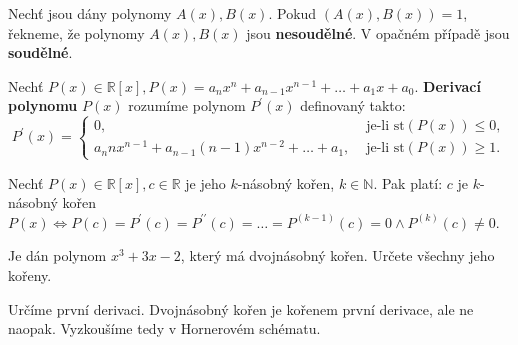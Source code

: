 \begin{definition}
  Nechť jsou dány polynomy $A(x), B(x)$. Pokud $(A(x), B(x)) = 1$, řekneme, že polynomy $A(x), B(x)$ jsou \textbf{nesoudělné}. V opačném případě jsou \textbf{soudělné}.
\end{definition}

\begin{definition}
    Nechť $P(x) \in \mathbb R[x], P(x)=a_nx^n+a_{n-1}x^{n-1}+\dots+a_1x+a_0.$ \textbf{Derivací polynomu} $P(x)$ rozumíme polynom $P^\prime(x)$ definovaný takto:
    $$
        P^\prime(x)=\begin{cases}
        0, &\text{ je-li st} (P(x)) \leq 0,\\
        a_n n x^{n-1} + a_{n-1}(n-1)x^{n-2} + \dots + a_1, & \text{ je-li st} (P(x)) \geq 1.
        \end{cases}
    $$
\end{definition}


\begin{veta}
    Nechť $P(x) \in \mathbb R[x], c \in \mathbb R$ je jeho $k$-násobný kořen, $k\in \mathbb N.$ Pak platí: $c$ je
    $k$-násobný kořen $P(x) \iff P(c)=P^\prime(c)=P^{\prime \prime}(c)=\dots= P^{(k-1)}(c)=0 \land P^{(k)}(c)\ne 0$.
\end{veta}


\begin{priklad}
Je dán polynom $x^3+3x-2$, který má dvojnásobný kořen.
Určete všechny jeho kořeny.
\end{priklad}

\begin{reseni}
Určíme první derivaci. Dvojnásobný kořen je kořenem první derivace, ale ne naopak.
Vyzkoušíme tedy v Hornerovém schématu.
\end{reseni}
